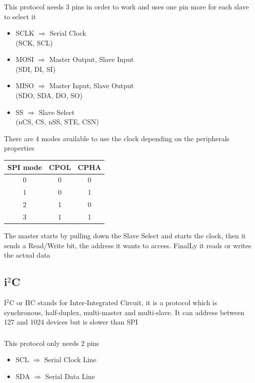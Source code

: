 \documentclass[12pt,a4paper,landscape]{article}
\begin{document}
\begin{multicols}{2}
		\subsubsection*{}
		This protocol needs 3 pins in order to work and uses one pin more for each slave to select it
		\begin{itemize}
			\item SCLK $\Rightarrow$ Serial Clock\\
				  (SCK, SCL)
			\item MOSI $\Rightarrow$ Master Output, Slave Input\\
				  (SDI, DI, SI)
			\item MISO $\Rightarrow$ Master Input, Slave Output\\
				  (SDO, SDA, DO, SO)
			\item SS $\Rightarrow$ Slave Select\\
				  (nCS, CS, nSS, STE, CSN)
		\end{itemize}
		There are 4 modes available to use the clock depending on the peripherals properties\\
			\begin{center}
				\begin{tabular}{|c|c|c|}\hline
					SPI mode & CPOL & CPHA \\\hline\hline
					0        & 0    & 0    \\\hline
					1        & 0    & 1    \\\hline
					2        & 1    & 0    \\\hline
					3        & 1    & 1    \\\hline
				\end{tabular}
			\end{center}

		The master starts by pulling down the Slave Select and starts the clock, then it sends a Read/Write bit, the address it wants to access. FinalLy it reads or writes the actual data


		\subsection*{\texorpdfstring{i$^{2}$C}{}}
		I$^2$C or IIC stands for Inter-Integrated Circuit, it is a protocol which is synchronous, half-duplex, multi-master and multi-slave. It can address between 127 and 1024 devices but is slower than SPI
		\subsubsection*{}
		This protocol only needs 2 pins
		\begin{itemize}
			\item SCL $\Rightarrow$ Serial Clock Line\\
			\item SDA $\Rightarrow$ Serial Data Line
		\end{itemize}
		\vspace{2cm}

\end{multicols}
\end{document}
